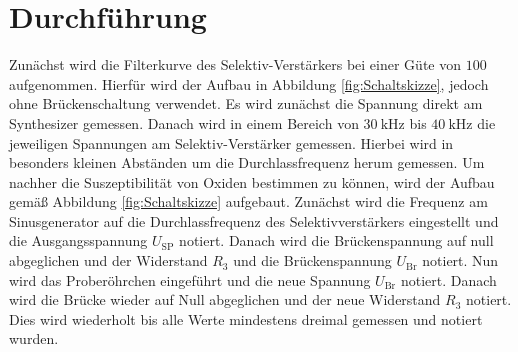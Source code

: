 
\section{Durchführung}
\label{sec:Durchführung}

Zunächst wird die Filterkurve des Selektiv-Verstärkers bei einer Güte von $100$ aufgenommen. Hierfür wird der Aufbau in Abbildung \ref{fig:Schaltskizze}, jedoch ohne Brückenschaltung verwendet. Es wird zunächst die Spannung direkt am Synthesizer gemessen. Danach wird in einem Bereich von $\SI{30}{\kilo\hertz}$ bis $\SI{40}{\kilo\hertz}$ die jeweiligen Spannungen am Selektiv-Verstärker gemessen. Hierbei wird in besonders kleinen Abständen um die Durchlassfrequenz herum gemessen. Um nachher die Suszeptibilität von Oxiden bestimmen zu können, wird der Aufbau gemäß Abbildung \ref{fig:Schaltskizze} aufgebaut. Zunächst wird die Frequenz am Sinusgenerator auf die Durchlassfrequenz des Selektivverstärkers eingestellt und die Ausgangsspannung $U_\text{SP}$ notiert. Danach wird die Brückenspannung auf null abgeglichen und der Widerstand $R_3$ und die Brückenspannung $U_\text{Br}$ notiert. Nun wird das Proberöhrchen eingeführt und die neue Spannung $U_\text{Br}$ notiert. Danach wird die Brücke wieder auf Null abgeglichen und der neue Widerstand $R_3$ notiert. Dies wird wiederholt bis alle Werte mindestens dreimal gemessen und notiert wurden. 